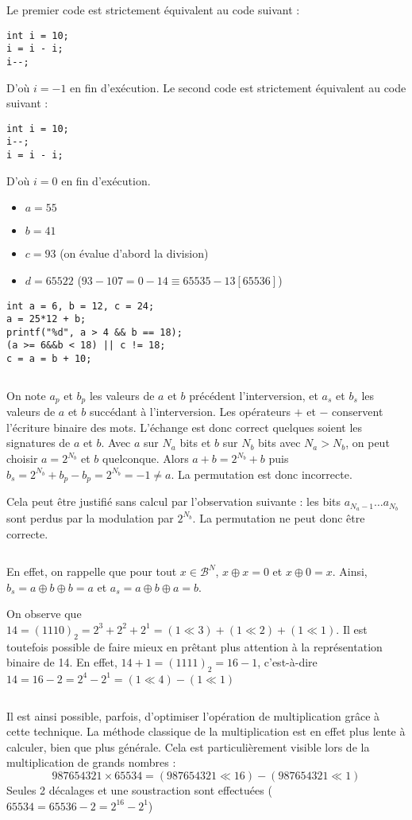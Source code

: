 \documentclass[../main.tex]{subfiles}
\begin{document}
Le premier code est strictement équivalent au code suivant :
\begin{verbatim}
int i = 10;
i = i - i;
i--;
\end{verbatim}
D'où $i = -1$ en fin d'exécution. 
Le second code est strictement équivalent au code suivant :
\begin{verbatim}
int i = 10;
i--;
i = i - i;
\end{verbatim}
D'où $i = 0$ en fin d'exécution.
 
\begin{itemize}
	\item $a = 55$
	\item $b = 41$
	\item $c = 93$ (on évalue d'abord la division)
	\item $d = 65522$ ($93 - 107 = 0 - 14 \equiv 65535 - 13 [65536]$)
\end{itemize}
\begin{verbatim}
int a = 6, b = 12, c = 24;
a = 25*12 + b;
printf("%d", a > 4 && b == 18);
(a >= 6&&b < 18) || c != 18;
c = a = b + 10;
\end{verbatim}
\inputminted{c}{solutions/part2/chapter2/inter_no_side_effect_1.c}
On note $a_{p}$ et $b_{p}$ les valeurs de $a$ et $b$ précédent l'interversion, et $a_{s}$ et $b_{s}$ les valeurs de $a$ et $b$ succédant à l'interversion.  
Les opérateurs $+$ et $-$ conservent l'écriture binaire des mots. L'échange est donc correct quelques soient les signatures de $a$ et $b$. 
Avec $a$ sur $N_{a}$ bits et $b$ sur $N_{b}$ bits avec $N_{a} > N_{b}$, on peut choisir $a = 2^{N_{b}}$ et $b$ quelconque. Alors $a + b = 2^{N_{b}}+b$ puis $b_{s} = 2^{N_{b}}+b_{p} - b_{p} = 2^{N_{b}} = -1 \neq{a}$. La permutation est donc incorrecte.
 
Cela peut être justifié sans calcul par l'observation suivante : les bits $a_{N_{a}-1}\dots a_{N_b}$ sont perdus par la modulation par $2^{N_{b}}$. La permutation ne peut donc être correcte.
 
\inputminted{c}{solutions/part2/chapter2/inter_no_side_effect_2.c}
En effet, on rappelle que pour tout ${x\in{\mathcal{B}^{N}}}$, $x\oplus{x} = 0$ et $x\oplus{0} = x$. Ainsi, $b_{s} = a\oplus{b}\oplus{b} = a$ et $a_{s} = a\oplus{b}\oplus{a} = b$.
 
 On observe que $14 = (1110)_{2} = 2^{3} + 2^{2} + 2^{1} = (1 \ll 3) + (1 \ll 2) + (1 \ll 1)$. Il est toutefois possible de faire mieux en prêtant plus attention à la représentation binaire de 14. En effet, $14 + 1 = (1111)_{2} = 16 - 1$, c'est-à-dire $14 = 16 - 2 = 2^{4} - 2^{1} = (1 \ll 4) - (1 \ll 1)$
\inputminted{c}{solutions/part2/chapter2/mult_decalage.c}
Il est ainsi possible, parfois, d'optimiser l'opération de multiplication grâce à cette technique. La méthode classique de la multiplication est en effet plus lente à calculer, bien que plus générale. Cela est particulièrement visible lors de la multiplication de grands nombres :
$$987654321\times{65534} = (987654321 \ll 16) - (987654321 \ll 1)$$
Seules 2 décalages et une soustraction sont effectuées ($65534 = 65536 - 2 = 2^{16} - 2^{1}$)
 
\end{document}
